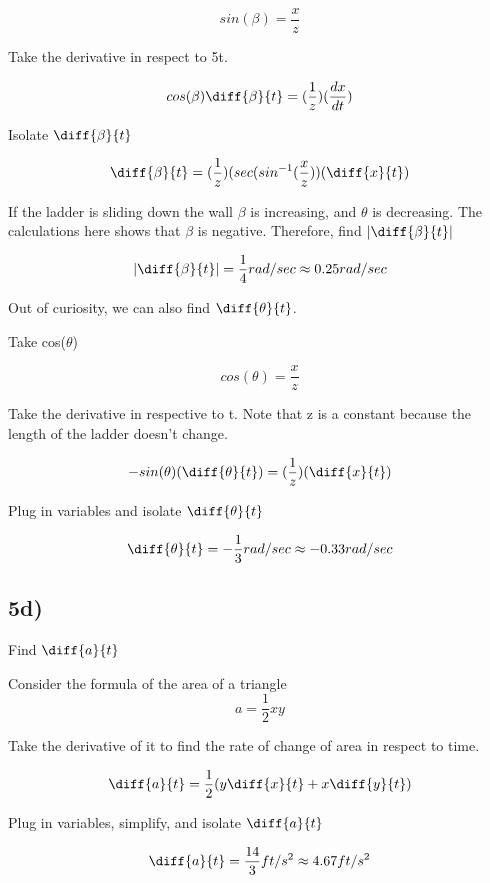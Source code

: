 \documentclass{article}
\begin{document}
\begin{equation}
    sin(\beta) = \frac{x}{z}
\end{equation}

Take the derivative in respect to 5t.

\begin{equation}
    cos(\beta) \diff{\beta}{t} = (\frac{1}{z})(\frac{dx}{dt})
\end{equation}

Isolate $\diff{\beta}{t}$

\begin{equation}
   \diff{\beta}{t} =  (\frac{1}{z})(sec(sin^{-1}(\frac{x}{z}))(\diff{x}{t})
\end{equation}

If the ladder is sliding down the wall $\beta$ is increasing, and $\theta$ is decreasing. The calculations here shows that $\beta$ is negative. Therefore, find $|\diff{\beta}{t}|$

\begin{equation}
    |\diff{\beta}{t}| = \frac{1}{4} rad/sec \approx 0.25 rad/sec
\end{equation}

Out of curiosity, we can also find $\diff{\theta}{t}$.

Take cos($\theta$)

\begin{equation}
    cos(\theta) = \frac{x}{z}
\end{equation}

Take the derivative in respective to t. Note that z is a constant because the length of the ladder doesn't change.

\begin{equation}
    -sin(\theta)(\diff{\theta}{t}) = (\frac{1}{z})(\diff{x}{t})
\end{equation}

Plug in variables and isolate $\diff{\theta}{t}$

\begin{equation}
\diff{\theta}{t} = - \frac{1}{3} rad/sec \approx -0.33 rad/sec    
\end{equation}

\subsection*{5d)}
Find $\diff{a}{t}$

Consider the formula of the area of a triangle
\begin{equation}
    a = \frac{1}{2}xy
\end{equation}

Take the derivative of it to find the rate of change of area in respect to time.

\begin{equation}
    \diff{a}{t} = \frac{1}{2}(y \diff{x}{t} + x \diff{y}{t})
\end{equation}

Plug in variables, simplify, and isolate $\diff{a}{t}$

\begin{equation}
    \diff{a}{t} = \frac{14}{3} ft/s^2 \approx 4.67 ft/s^2
\end{equation}
\end{document}
